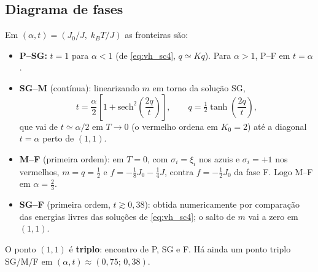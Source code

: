 \documentclass[12pt,a4paper]{article}
\begin{document}
\subsection*{Diagrama de fases}
Em $(\alpha,t)=(J_0/J,\;k_BT/J)$ as fronteiras são:
%
\begin{itemize}
    \item \textbf{P--SG:} $t=1$ para $\alpha<1$ (de \eqref{eq:vh_sc4}, $q\simeq Kq$). Para $\alpha>1$, P--F em $t=\alpha$.
    \item \textbf{SG--M} (contínua): linearizando $m$ em torno da solução SG,
    \begin{equation}
        t=\frac{\alpha}{2}\left[1+\mathrm{sech}^2\!\left(\frac{2q}{t}\right)\right],
        \qquad q=\tfrac12\tanh\!\left(\frac{2q}{t}\right),
        \label{eq:vh_SGM}
    \end{equation}
    que vai de $t\simeq\alpha/2$ em $T\to0$ (o vermelho ordena em $K_0=2$)
    até a diagonal $t=\alpha$ perto de $(1,1)$.
    \item \textbf{M--F} (primeira ordem): em $T=0$, com $\sigma_i=\xi_i$ nos azuis e
    $\sigma_i=+1$ nos vermelhos, $m=q=\tfrac12$ e $f=-\tfrac18J_0-\tfrac14J$,
    contra $f=-\tfrac12J_0$ da fase F. Logo M--F em $\alpha=\tfrac23$.
    \item \textbf{SG--F} (primeira ordem, $t\gtrsim0{,}38$): obtida numericamente por
    comparação das energias livres das soluções de \eqref{eq:vh_sc4}; o salto
    de $m$ vai a zero em $(1,1)$.
\end{itemize}
%
O ponto $(1,1)$ é \textbf{triplo}: encontro de P, SG e F. Há ainda um
ponto triplo SG/M/F em $(\alpha,t)\approx(0{,}75;\,0{,}38)$.
\end{document}
